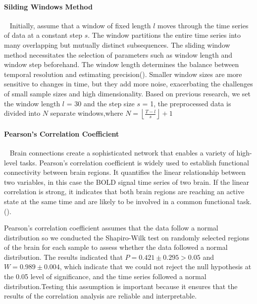\documentclass[a4paper]{cas-dc}
\begin{document}
\paragraph{Silding Windows Method}~{}
\newline
\indent Initially, assume that a window of fixed length $l$ moves through the time series of data at a constant step $s$. The window partitions the entire time series into many overlapping but mutually distinct subsequences. The sliding window method necessitates the selection of parameters such as window length and window step beforehand. The window length determines the balance between temporal resolution and estimating precision(\cite{savva2019assessment}). Smaller window sizes are more sensitive to changes in time, but they add more noise, exacerbating the challenges of small sample sizes and high dimensionality. Based on previous research, we set the window length $l$ = 30 and the step size $s$ = 1, the preprocessed data is divided into $N$ separate windows,where $N = \left \lfloor \frac{T - l}{s} \right \rfloor + 1$
\paragraph{Pearson's Correlation Coefficient}~{}
\newline
\indent Brain connections create a sophisticated network that enables a variety of high-level tasks. Pearson's correlation coefficient is widely used to establish functional connectivity between brain regions. It quantifies the linear relationship between two variables, in this case the BOLD signal time series of two brain. If the linear correlation is strong, it indicates that both brain regions are reaching an active state at the same time and are likely to be involved in a common functional task.(\cite{ju2017early}).

Pearson's correlation coefficient assumes that the data follow a normal distribution so we conducted the Shapiro-Wilk test on randomly selected regions of the brain for each sample to assess whether the data followed a normal distribution. The results indicated that $P=0.421\pm 0.295>0.05$ and $W=0.989\pm 0.004$, which indicate that we could not reject the null hypothesis at the 0.05 level of significance, and the time series followed a normal distribution.Testing this assumption is important because it ensures that the results of the correlation analysis are reliable and interpretable.
\end{document}
